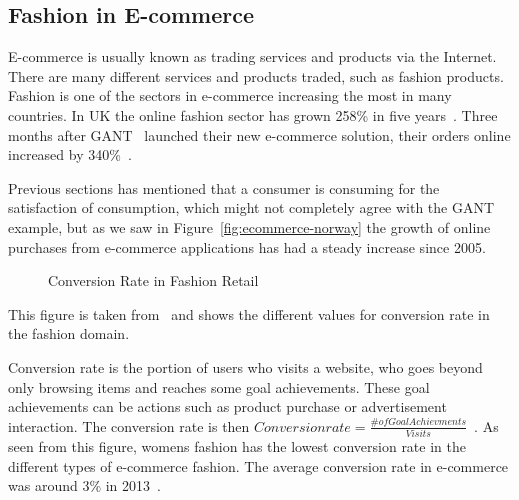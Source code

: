 
\subsection{Fashion in E-commerce}
  \label{subsubs:fashionInEcom}

  E-commerce is usually known as trading services and products via the
  Internet. There are many different services and products traded, such as
  fashion products. Fashion is one of the sectors in e-commerce increasing the
  most in many countries. In UK the online fashion sector has grown 258\% in
  five years~\cite{Divante2014}. Three months after GANT~\cite{gant} launched
  their new e-commerce solution, their orders online increased by
  340\%~\cite{magentoGant}.

  Previous sections has mentioned that a consumer is consuming for the
  satisfaction of consumption, which might not completely agree with the GANT
  example, but as we saw in Figure~\ref{fig:ecommerce-norway} the growth of online purchases
  from e-commerce applications has had a steady increase since 2005.


  \begin{figure}[H]
      \centering
      \caption{Conversion Rate in Fashion Retail}
  \end{figure}

  This figure is taken from~\cite{Jorij2012} and shows the different values for
  conversion rate in the fashion domain.

  Conversion rate is the portion of users who visits a website, who goes beyond
  only browsing items and reaches some goal achievements.  These goal
  achievements can be actions such as product purchase or advertisement
  interaction.  The conversion rate is then $Conversion rate = \frac{\# of Goal
  Achievments}{Visits}$~\cite{nielsen2013}.  As seen from this figure, womens
  fashion has the lowest conversion rate in the different types of e-commerce
  fashion.  The average conversion rate in e-commerce was around 3\% in
  2013~\cite{nielsen2013}.

